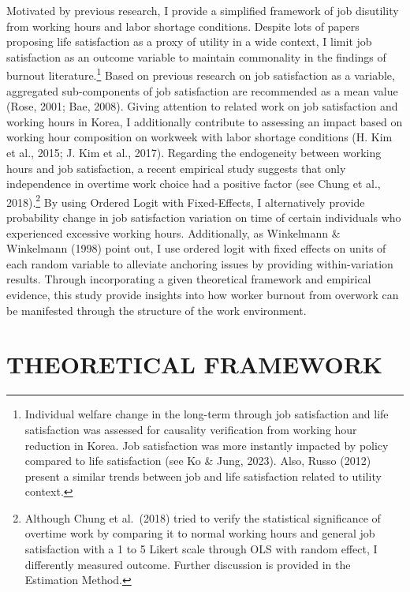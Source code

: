 \documentclass[
  12pt,
]{article}
\begin{document}
Motivated by previous research, I provide a simplified framework of job
disutility from working hours and labor shortage conditions. Despite
lots of papers proposing life satisfaction as a proxy of utility in a
wide context, I limit job satisfaction as an outcome variable to
maintain commonality in the findings of burnout literature.\footnote{Individual
  welfare change in the long-term through job satisfaction and life
  satisfaction was assessed for causality verification from working hour
  reduction in Korea. Job satisfaction was more instantly impacted by
  policy compared to life satisfaction (see Ko \& Jung, 2023). Also,
  Russo (2012) present a similar trends between job and life
  satisfaction related to utility context.} Based on previous research
on job satisfaction as a variable, aggregated sub-components of job
satisfaction are recommended as a mean value (Rose, 2001; Bae, 2008).
Giving attention to related work on job satisfaction and working hours
in Korea, I additionally contribute to assessing an impact based on
working hour composition on workweek with labor shortage conditions (H.
Kim et al., 2015; J. Kim et al., 2017). Regarding the endogeneity
between working hours and job satisfaction, a recent empirical study
suggests that only independence in overtime work choice had a positive
factor (see Chung et al., 2018).\footnote{Although Chung et al.~(2018)
  tried to verify the statistical significance of overtime work by
  comparing it to normal working hours and general job satisfaction with
  a 1 to 5 Likert scale through OLS with random effect, I differently
  measured outcome. Further discussion is provided in the Estimation
  Method.} By using Ordered Logit with Fixed-Effects, I alternatively
provide probability change in job satisfaction variation on time of
certain individuals who experienced excessive working hours.
Additionally, as Winkelmann \& Winkelmann (1998) point out, I use
ordered logit with fixed effects on units of each random variable to
alleviate anchoring issues by providing within-variation results.
Through incorporating a given theoretical framework and empirical
evidence, this study provide insights into how worker burnout from
overwork can be manifested through the structure of the work
environment.

\newpage

\section{THEORETICAL FRAMEWORK}\label{theoretical-framework}
\end{document}
